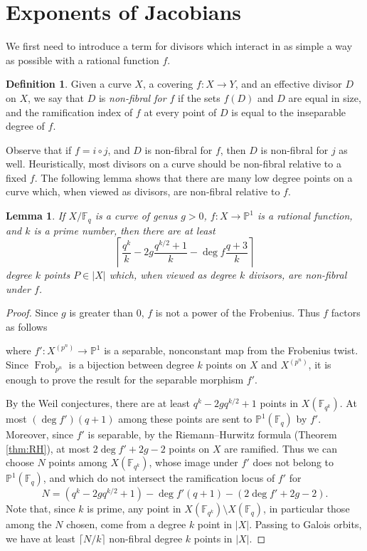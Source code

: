 \documentclass[11pt]{amsart}
\newcommand{\F}{\mathbb{F}}
\newcommand{\PP}{\mathbb{P}}
\DeclareMathOperator{\Frob}{Frob}
\newtheorem{lemma}[theorem]{Lemma}
\theoremstyle{definition}
\newtheorem{definition}[theorem]{Definition}
\theoremstyle{remark}
\begin{document}
\section{Exponents of Jacobians}\label{sec:pfofmain}

We first need to introduce a term for divisors which interact in as simple a way as possible with a rational function $f$.

\begin{definition}
    Given a curve $X$, a covering $f: X \to Y$, and an effective divisor $D$ on $X$, we say that $D$ is \emph{non-fibral for $f$} if the sets $f(D)$ and $D$ are equal in size, and the ramification index of $f$ at every point of $D$ is equal to the inseparable degree of $f$.
\end{definition}
Observe that if $f=i \circ j$, and $D$ is non-fibral for $f$, then $D$ is non-fibral for $j$ as well. Heuristically, most divisors on a curve should be non-fibral relative to a fixed $f$. The following lemma shows that there are many low degree points on a curve which, when viewed as divisors, are non-fibral relative to $f$.
\begin{lemma}\label{lem:non-fibralcount}
    If $X/\F_q$ is a curve of genus $g>0$, $f: X \to \PP^1$ is a rational function, and $k$ is a prime number, then there are at least 
    \[\left\lceil\frac{q^k}{k} - 2g\frac{q^{k/2}+1}{k} - \deg f \frac{q+3}{k}\right\rceil\] 
    degree $k$ points $P \in |X|$ which, when viewed as degree $k$ divisors, are non-fibral under $f$. 
\end{lemma}

\begin{proof}
    Since $g$ is greater than $0$, $f$ is not a power of the Frobenius. Thus $f$ factors as follows
    \begin{center}
    \end{center}
    where $f':X^{(p^n)} \to \PP^1$ is a separable, nonconstant map from the Frobenius twist. Since $\Frob_{p^n}$ is a bijection between degree $k$ points on $X$ and $X^{(p^n)}$, it is enough to prove the result for the separable morphism $f'$.

    By the Weil conjectures, there are at least $q^k-2gq^{k/2}+1$ points in $X(\F_{q^k})$. At most $(\deg f') (q+1)$ among these points are sent to $\PP^1(\F_q)$ by $f'$. Moreover, since $f'$ is separable, by the Riemann--Hurwitz formula (Theorem \ref{thm:RH}), at most $2\deg f' + 2g -2$ points on $X$ are ramified. Thus we can choose $N$ points among $X(\F_{q^k})$, whose image under $f'$ does not belong to $\PP^1(\F_q)$, and which do not intersect the ramification locus of $f'$ for \[N=(q^k-2gq^{k/2}+1) - \deg f' (q+1) - (2\deg f' + 2g - 2).\]
    Note that, since $k$ is prime, any point in $X(\F_{q^k})\setminus X(\F_q)$, in particular those among the $N$ chosen, come from a degree $k$ point in $|X|$. Passing to Galois orbits, we have at least $\lceil N/k \rceil$ non-fibral degree $k$ points in $|X|$.
\end{proof}
\end{document}
